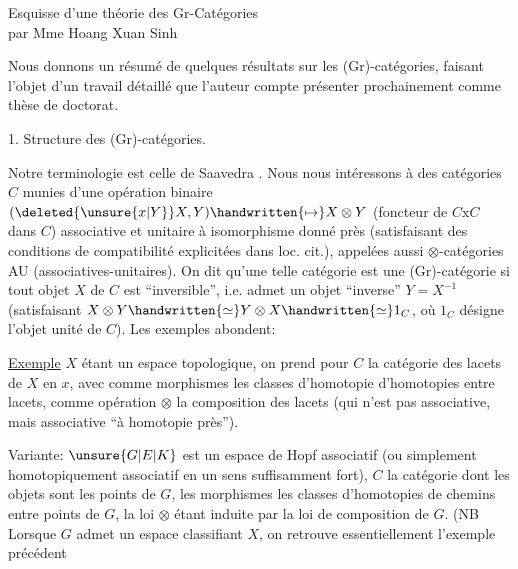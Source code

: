 
\begin{center}
Esquisse d'une théorie des Gr-Catégories\\
par Mme Hoang Xuan Sinh
\end{center}

Nous donnons un résumé de quelques résultats sur les (Gr)-catégories, faisant l'objet d'un travail détaillé que l'auteur compte présenter prochainement comme thèse de doctorat\handwritten{[\, ]}.

1. Structure des (Gr)-catégories.

Notre terminologie est celle de Saavedra \handwritten{[\, ]}. Nous nous intéressons à des catégories $C$ munies d'une opération binaire $(\deleted{\unsure{x|Y}}X,Y)\handwritten{\mapsto}X\otimes Y$ (foncteur de $C\mathbin{\mathrm{x}}C$ dans $C$) associative et unitaire à isomorphisme donné près (satisfaisant des conditions de compatibilité explicitées dans loc. cit.), appelées aussi $\otimes$-catégories AU (associatives-unitaires). On dit qu'une telle catégorie est une (Gr)-catégorie si  tout objet $X$ de $C$ est ``inversible'', i.e. admet un objet ``inverse'' $Y=X^{-1}$ (satisfaisant $X\otimes Y\handwritten{\simeq}Y\otimes X\handwritten{\simeq}1_C$, où $1_C$ désigne l'objet unité de $C$). Les exemples abondent:

\uline{Exemple}  $X$ étant un espace topologique, on prend pour $C$ la catégorie des lacets de $X$ en $x$, avec comme morphismes les classes d'homotopie d'homotopies entre lacets, comme opération $\otimes$ la composition des lacets (qui n'est pas associative, mais associative ``à homotopie près'').

Variante: $\unsure{G|E|K}$ est un espace de Hopf associatif (ou simplement homotopiquement associatif en un sens suffisamment fort), $C$ la catégorie dont les objets sont les points de $G$, les morphismes les classes d'homotopies de chemins entre points de $G$, la loi $\otimes$ étant induite par la loi de composition de $G$. (NB Lorsque $G$ admet un espace classifiant $X$, on retrouve essentiellement l'exemple précédent

